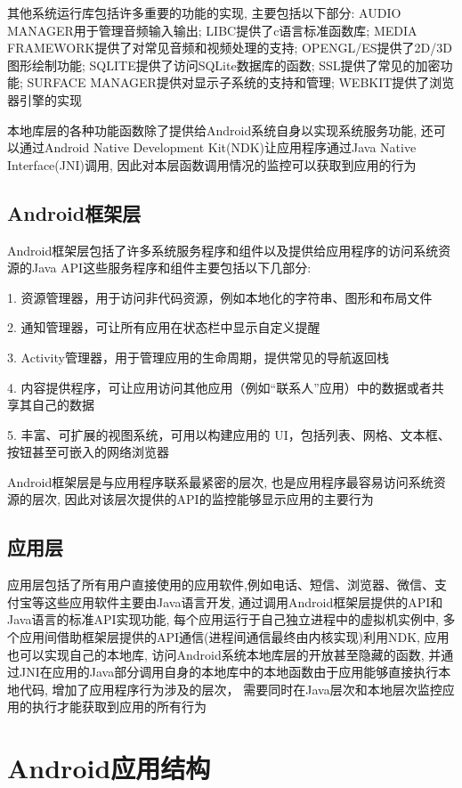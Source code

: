 其他系统运行库包括许多重要的功能的实现, 主要包括以下部分: 
AUDIO MANAGER用于管理音频输入输出; 
LIBC提供了c语言标准函数库; 
MEDIA FRAMEWORK提供了对常见音频和视频处理的支持; 
OPENGL/ES提供了2D/3D图形绘制功能;
SQLITE提供了访问SQLite数据库的函数;
SSL提供了常见的加密功能;
SURFACE MANAGER提供对显示子系统的支持和管理;
WEBKIT提供了浏览器引擎的实现\juhao

本地库层的各种功能函数除了提供给Android系统自身以实现系统服务功能, 还可以通过Android Native Development Kit(NDK)让应用程序通过Java Native Interface(JNI)调用, 因此对本层函数调用情况的监控可以获取到应用的行为\juhao

\subsection*{Android框架层}
Android框架层包括了许多系统服务程序和组件以及提供给应用程序的访问系统资源的Java API\juhao 这些服务程序和组件主要包括以下几部分:

1. 资源管理器，用于访问非代码资源，例如本地化的字符串、图形和布局文件

2. 通知管理器，可让所有应用在状态栏中显示自定义提醒

3. Activity管理器，用于管理应用的生命周期，提供常见的导航返回栈

4. 内容提供程序，可让应用访问其他应用（例如“联系人”应用）中的数据或者共享其自己的数据

5. 丰富、可扩展的视图系统，可用以构建应用的 UI，包括列表、网格、文本框、按钮甚至可嵌入的网络浏览器

Android框架层是与应用程序联系最紧密的层次, 也是应用程序最容易访问系统资源的层次, 因此对该层次提供的API的监控能够显示应用的主要行为\juhao

\subsection*{应用层}
应用层包括了所有用户直接使用的应用软件,例如电话、短信、浏览器、微信、支付宝等\juhao 这些应用软件主要由Java语言开发, 通过调用Android框架层提供的API和Java语言的标准API实现功能, 每个应用运行于自己独立进程中的虚拟机实例中, 多个应用间借助框架层提供的API通信(进程间通信最终由内核实现)\juhao 利用NDK, 应用也可以实现自己的本地库, 访问Android系统本地库层的开放甚至隐藏的函数, 并通过JNI在应用的Java部分调用自身的本地库中的本地函数\juhao 由于应用能够直接执行本地代码, 增加了应用程序行为涉及的层次， 需要同时在Java层次和本地层次监控应用的执行才能获取到应用的所有行为\juhao


\section{Android应用结构}

